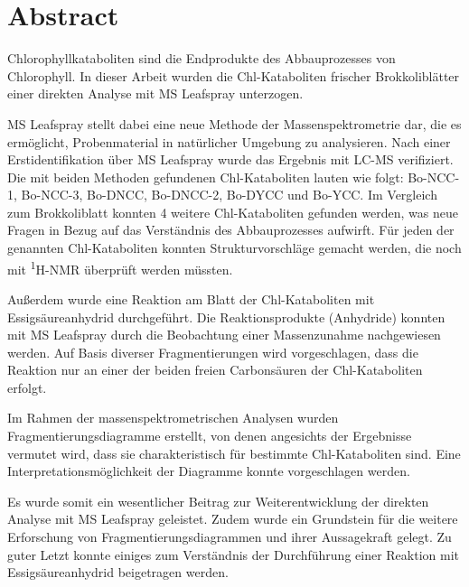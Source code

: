 

\chapter*{Abstract}
\label{cha:abstract}

Chlorophyllkataboliten sind die Endprodukte des Abbauprozesses von Chlorophyll. In dieser Arbeit wurden die Chl-Kataboliten frischer Brokkoliblätter einer direkten Analyse mit MS Leafspray unterzogen. 

MS Leafspray stellt dabei eine neue Methode der Massenspektrometrie dar, die es ermöglicht, Probenmaterial in natürlicher Umgebung zu analysieren. Nach einer Erstidentifikation über MS Leafspray wurde das Ergebnis mit LC-MS verifiziert. Die mit beiden Methoden gefundenen Chl-Kataboliten lauten wie folgt: Bo-NCC-1, Bo-NCC-3, Bo-DNCC, Bo-DNCC-2, Bo-DYCC und Bo-YCC. Im Vergleich zum Brokkoliblatt konnten 4 weitere Chl-Kataboliten gefunden werden, was neue Fragen in Bezug auf das Verständnis des Abbauprozesses aufwirft. Für jeden der genannten Chl-Kataboliten konnten Strukturvorschläge gemacht werden, die noch mit \textsuperscript{1}H-NMR überprüft werden müssten.

Außerdem wurde eine Reaktion am Blatt der Chl-Kataboliten mit Essigsäureanhydrid durchgeführt. Die Reaktionsprodukte (Anhydride) konnten mit MS Leafspray durch die Beobachtung einer Massenzunahme nachgewiesen werden. Auf Basis diverser Fragmentierungen wird vorgeschlagen, dass die Reaktion nur an einer der beiden freien Carbonsäuren der Chl-Kataboliten erfolgt. 

Im Rahmen der massenspektrometrischen Analysen wurden Fragmentierungsdiagramme erstellt, von denen angesichts der Ergebnisse vermutet wird, dass sie charakteristisch für bestimmte Chl-Kataboliten sind. Eine Interpretationsmöglichkeit der Diagramme konnte vorgeschlagen werden. 

Es wurde somit ein wesentlicher Beitrag zur Weiterentwicklung der direkten Analyse mit MS Leafspray geleistet. Zudem wurde ein Grundstein für die weitere Erforschung von Fragmentierungsdiagrammen und ihrer Aussagekraft gelegt. Zu guter Letzt konnte einiges zum Verständnis der Durchführung einer Reaktion mit Essigsäureanhydrid beigetragen werden.



